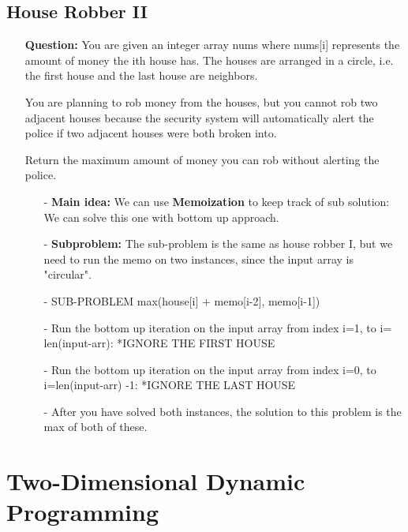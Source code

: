 \documentclass[12pt]{article}
\begin{document}
\subsection{House Robber II}
\begin{enumerate}
  \item[] \textbf{Question:} You are given an integer array nums where nums[i] represents the amount of money the ith house has. The houses are arranged in a circle, i.e. the first house and the last house are neighbors.

You are planning to rob money from the houses, but you cannot rob two adjacent houses because the security system will automatically alert the police if two adjacent houses were both broken into.

Return the maximum amount of money you can rob without alerting the police.


    \begin{enumerate}
      \item[-] \textbf{Main idea:} We can use \textbf{Memoization} to keep track of sub solution: We can solve this one with bottom up approach.
      \item[-] \textbf{Subproblem:} The sub-problem is the same as house robber I, but we need to run the memo on two instances, since the input array is "circular".
      \item[-] SUB-PROBLEM max(house[i] + memo[i-2], memo[i-1])
      \item[-] Run the bottom up iteration on the input array from index i=1, to i= len(input-arr): *IGNORE THE FIRST HOUSE
      \item[-] Run the bottom up iteration on the input array from index i=0, to i=len(input-arr) -1: *IGNORE THE LAST HOUSE
      \item[-] After you have solved both instances, the solution to this problem is the max of both of these.
    \end{enumerate}
\end{enumerate}



\section{Two-Dimensional Dynamic Programming}
\end{document}
